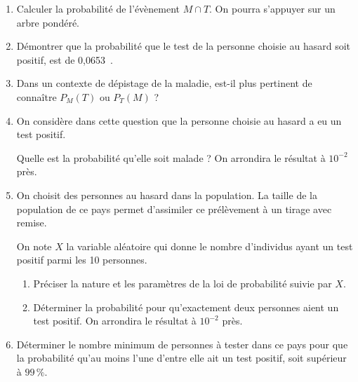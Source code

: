 \documentclass[10pt]{article}
\providecommand{\np}[2][]{{#2~#1}}
\begin{document}
\begin{enumerate}
\item Calculer la probabilité de l'évènement $M \cap T$. On pourra s'appuyer sur un arbre pondéré.
\item Démontrer que la probabilité que le test  de la personne choisie au hasard soit positif, est de \np{0,0653}.
\item Dans un contexte de dépistage de la maladie, est-il plus pertinent de connaître $P_M(T)$ ou $P_T(M)$ ?
\item On considère dans cette question que la personne choisie au hasard a eu un test positif.

Quelle est la probabilité qu'elle soit malade ? On arrondira le résultat à $10^{-2}$ près.
\item On choisit des personnes au hasard dans la population. La taille de la population de ce pays permet d'assimiler ce prélèvement à un tirage avec remise.

On note $X$ la variable aléatoire qui donne le nombre d'individus ayant un test positif parmi les 10 personnes. 
	\begin{enumerate}
		\item Préciser la nature et les paramètres de la loi de probabilité suivie par $X$.
		\item Déterminer la probabilité pour qu'exactement deux personnes aient un test positif. On arrondira le résultat à $10^{-2}$ près.
	\end{enumerate}	
\item Déterminer le nombre minimum de personnes à tester dans ce pays pour que la probabilité qu'au moins l'une d'entre elle ait un test positif, soit supérieur à $99\,\%$.
\end{enumerate}

\bigskip
\end{document}
